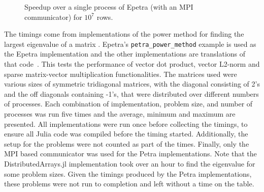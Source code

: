 \documentclass[acmsmall]{acmart}
\begin{document}
	\begin{figure}
		\centering
		\caption{Speedup over a single process of Epetra (with an MPI communicator) for \(10^7\) rows.}
		\label{fig:result-numProcs}
	\end{figure}

	The timings come from implementations of the power method for finding the largest eigenvalue of a matrix
	\cite{Gu:2000:PowerMethod}.
	Epetra's \texttt{petra\_power\_method} example is used as the Epetra implementation and the other implementations are translations of that code~\cite{Heroux:2005:Trilinos}.
	This tests the performance of vector dot product, vector L2-norm and sparse matrix-vector multiplication functionalities.
	The matrices used were various sizes of symmetric tridiagonal matrices, with the diagonal consisting of 2's
	and the off diagonals containing -1's, that were distributed over different numbers of processes.
	Each combination of implementation, problem size, and number of processes was run five times and the average, minimum and maximum are presented.
	All implementations were run once before collecting the timings, to ensure all Julia code was
	compiled before the timing started.
	Additionally, the setup for the problems were not counted as part of the times.
	Finally, only the MPI based communicator was used for the Petra implementations.
	Note that the DistributedArrays.jl implementation took over an hour to find the eigenvalue for some problem sizes.
	Given the timings produced by the Petra implementations, these problems were not run to completion and left without a time on the table.
	
\end{document}
